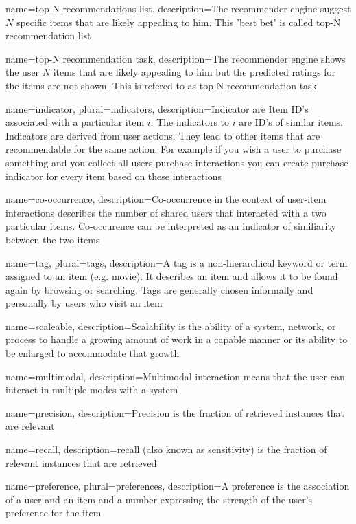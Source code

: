 {
name=top-N recommendations list,
description={The recommender engine suggest $N$ specific items that are likely appealing to him. This 'best bet' is called top-N recommendation list}
}

{
name=top-N recommendation task,
description={The recommender engine shows the user $N$ items that are likely appealing to him but the predicted ratings for the items are not shown. This is refered to as top-N recommendation task}
}


{
name={indicator},
plural={indicators},
description={Indicator are Item ID's associated with a particular item $i$. The indicators to $i$ are  ID's of similar items. Indicators are derived from user actions. They lead to other items that are recommendable for the same action. For example if you wish a user to purchase something and you collect all users purchase interactions you can create purchase indicator for every item based on these interactions}
}

{
name={co-occurrence},
description={Co-occurrence in the context of user-item interactions describes the number of shared users that interacted with a two particular items. Co-occurence can be interpreted as an indicator of similiarity between the two items}
}

{
name={tag},
plural={tags},
description={A tag is a non-hierarchical keyword or term assigned to an item (e.g. movie). It describes an item and allows it to be found again by browsing or searching. Tags are generally chosen informally and personally by users who visit an item}
}

{
name={scaleable},
description={Scalability is the ability of a system, network, or process to handle a growing amount of work in a capable manner or its ability to be enlarged to accommodate that growth}
}

{
name={multimodal},
description={Multimodal interaction means that the user can interact in multiple modes with a system}
}

{
name={precision},
description={Precision is the fraction of retrieved instances that are relevant}
}

{
name={recall},
description={recall (also known as sensitivity) is the fraction of relevant instances that are retrieve}d 
}

{
name={preference},
plural={preferences},
description={A preference is the association of a user and an item and a number expressing the strength of the user's preference for the item}
}

